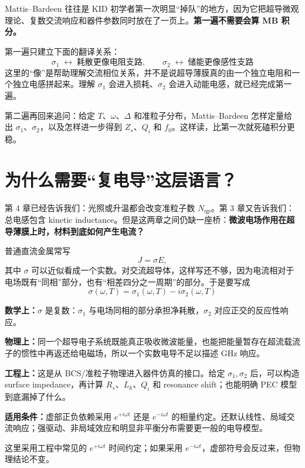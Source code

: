 \documentclass[11pt,a4paper,openany]{ctexrep}
\newcommand{\formulaexplain}[4]{%
\begin{formulaguidebox}
\textbf{\color{KidBlue}数学上：}#1\par
\textbf{\color{KidTeal}物理上：}#2\par
\textbf{\color{KidGold!55!black}工程上：}#3\par
\textbf{\color{KidRed}适用条件：}#4
\end{formulaguidebox}%
}
\newcommand{\qp}{\mathrm{qp}}
\begin{document}
\begin{tcolorbox}[colback=KidGold!9,colframe=KidGold!75!black,boxrule=0.7pt,arc=2mm,title=这一章建议读两遍：第一遍只抓住 $\sigma_1$ 和 $\sigma_2$,fonttitle=\bfseries]
Mattis--Bardeen 往往是 KID 初学者第一次明显“掉队”的地方，因为它把超导微观理论、复数交流响应和器件参数同时放在了一页上。\textbf{第一遍不需要会算 MB 积分。}

第一遍只建立下面的翻译关系：
\[
\boxed{
\sigma_1\;\longleftrightarrow\;\text{耗散更像电阻支路},
\qquad
\sigma_2\;\longleftrightarrow\;\text{储能更像感性支路}
}
\]
这里的“像”是帮助理解交流相位关系，并不是说超导薄膜真的由一个独立电阻和一个独立电感拼起来。理解 $\sigma_1$ 会进入损耗、$\sigma_2$ 会进入动能电感，就已经完成第一遍。

第二遍再回来追问：给定 $T$、$\omega$、$\Delta$ 和准粒子分布，Mattis--Bardeen 怎样定量给出 $\sigma_1$、$\sigma_2$，以及怎样进一步得到 $Z_s$、$Q_i$ 和 $f_0$。这样读，比第一次就死磕积分更稳。
\end{tcolorbox}

\section{为什么需要“复电导”这层语言？}

第 4 章已经告诉我们：光照或升温都会改变准粒子数 $N_{\qp}$。第 3 章又告诉我们：总电感包含 kinetic inductance。但是这两章之间仍缺一座桥：\textbf{微波电场作用在超导薄膜上时，材料到底如何产生电流？}

普通直流金属常写
\[
J=\sigma E,
\]
其中 $\sigma$ 可以近似看成一个实数。对交流超导体，这样写还不够，因为电流相对于电场既有“同相”部分，也有“相差四分之一周期”的部分。于是要写成
\[
\boxed{
\sigma(\omega,T)=\sigma_1(\omega,T)-i\sigma_2(\omega,T)
}
\]
\formulaexplain
{$\sigma$ 是复数：$\sigma_1$ 与电场同相的部分承担净耗散，$\sigma_2$ 对应正交的反应性响应。}
{同一个超导电子系统既能真正吸收微波能量，也能把能量暂存在超流载流子的惯性中再返还给电磁场，所以一个实数电导不足以描述 GHz 响应。}
{这是从 BCS/准粒子物理进入器件仿真的接口。给定 $\sigma_1,\sigma_2$ 后，可以构造 surface impedance，再计算 $R_s$、$L_k$、$Q_i$ 和 resonance shift；也能明确 PEC 模型到底漏掉了什么。}
{虚部正负依赖采用 $e^{+i\omega t}$ 还是 $e^{-i\omega t}$ 的相量约定。还默认线性、局域交流响应；强驱动、非局域效应和明显非平衡分布需要更一般的电导模型。}

这里采用工程中常见的 $e^{+i\omega t}$ 时间约定；如果采用 $e^{-i\omega t}$，虚部符号会反过来，但物理结论不变。
\end{document}
